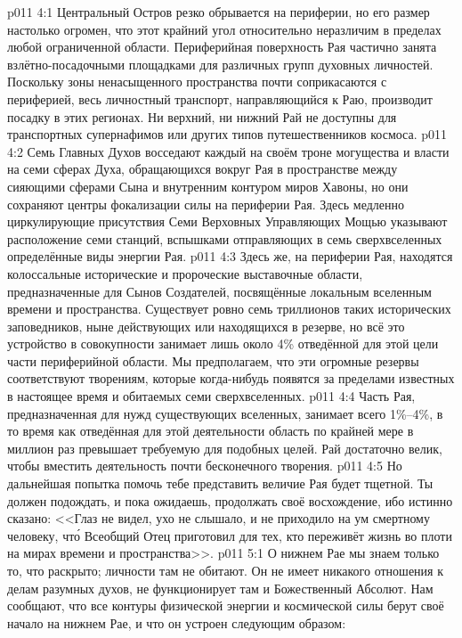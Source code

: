 \vs p011 4:1 Центральный Остров резко обрывается на периферии, но его размер настолько огромен, что этот крайний угол относительно неразличим в пределах любой ограниченной области. Периферийная поверхность Рая частично занята взлётно\hyp{}посадочными площадками для различных групп духовных личностей. Поскольку зоны ненасыщенного пространства почти соприкасаются с периферией, весь личностный транспорт, направляющийся к Раю, производит посадку в этих регионах. Ни верхний, ни нижний Рай не доступны для транспортных супернафимов или других типов путешественников космоса.
\vs p011 4:2 Семь Главных Духов восседают каждый на своём троне могущества и власти на семи сферах Духа, обращающихся вокруг Рая в пространстве между сияющими сферами Сына и внутренним контуром миров Хавоны, но они сохраняют центры фокализации силы на периферии Рая. Здесь медленно циркулирующие присутствия Семи Верховных Управляющих Мощью указывают расположение семи станций, вспышками отправляющих в семь сверхвселенных определённые виды энергии Рая.
\vs p011 4:3 Здесь же, на периферии Рая, находятся колоссальные исторические и пророческие выставочные области, предназначенные для Сынов Создателей, посвящённые локальным вселенным времени и пространства. Существует ровно семь триллионов таких исторических заповедников, ныне действующих или находящихся в резерве, но всё это устройство в совокупности занимает лишь около 4\% отведённой для этой цели части периферийной области. Мы предполагаем, что эти огромные резервы соответствуют творениям, которые когда\hyp{}нибудь появятся за пределами известных в настоящее время и обитаемых семи сверхвселенных.
\vs p011 4:4 Часть Рая, предназначенная для нужд существующих вселенных, занимает всего 1\%--4\%, в то время как отведённая для этой деятельности область по крайней мере в миллион раз превышает требуемую для подобных целей. Рай достаточно велик, чтобы вместить деятельность почти бесконечного творения.
\vs p011 4:5 Но дальнейшая попытка помочь тебе представить величие Рая будет тщетной. Ты должен подождать, и пока ожидаешь, продолжать своё восхождение, ибо истинно сказано: <<Глаз не видел, ухо не слышало, и не приходило на ум смертному человеку, чт\'о Всеобщий Отец приготовил для тех, кто переживёт жизнь во плоти на мирах времени и пространства>>.
\vs p011 5:1 О нижнем Рае мы знаем только то, что раскрыто; личности там не обитают. Он не имеет никакого отношения к делам разумных духов, не функционирует там и Божественный Абсолют. Нам сообщают, что все контуры физической энергии и космической силы берут своё начало на нижнем Рае, и что он устроен следующим образом:
